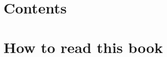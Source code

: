 \documentclass[11pt,a4paper,openany]{book}
\begin{document}

\clearpage
{}\setcounter{page}{1}
\chapter*{Contents}
\renewcommand{\contentsname}{}\tableofcontents
\clearpage
\chapter*{How to read this book}

\clearpage
{}\setcounter{page}{1}














\end{document}
